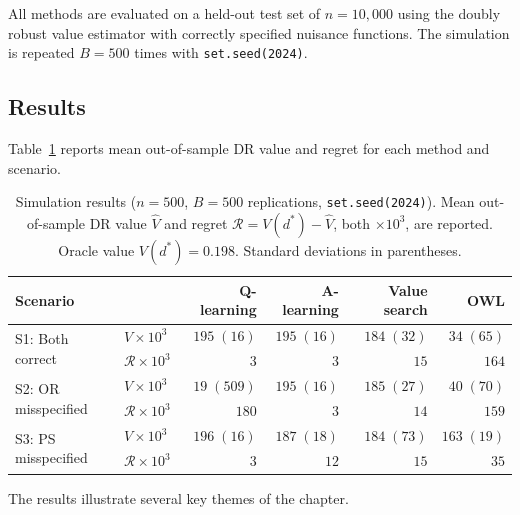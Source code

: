 \documentclass[master.tex]{subfiles}
\begin{document}
\medskip
All methods are evaluated on a held-out test set of $n=10{,}000$ using the
doubly robust value estimator with correctly specified nuisance functions.
The simulation is repeated $B=500$ times with \texttt{set.seed(2024)}.

\subsection{Results}
\label{w14:subsec:lab-results}

Table~\ref{w14:tab:sim} reports mean out-of-sample DR value and regret
for each method and scenario.

\begin{table}[ht]
\centering
\caption{Simulation results ($n=500$, $B=500$ replications,
\texttt{set.seed(2024)}). Mean out-of-sample DR value $\hat V$ and
regret $\mathcal{R}=V(d^\ast)-\hat V$, both $\times10^3$, are reported.
Oracle value $V(d^\ast)=0.198$. Standard deviations in parentheses.}
\label{w14:tab:sim}
\renewcommand{\arraystretch}{1.3}
\begin{tabular}{llrrrr}
\hline
Scenario & & Q-learning & A-learning & Value search & OWL \\
\hline
\multirow{2}{*}{S1: Both correct}
  & $\hat V\times 10^3$          & $195\;(16)$   & $195\;(16)$  & $184\;(32)$   & $\phantom{0}34\;(65)$  \\
  & $\mathcal{R}\times 10^3$     & $\phantom{0}3$& $\phantom{0}3$ & $15$        & $164$ \\[4pt]
\multirow{2}{*}{S2: OR misspecified}
  & $\hat V\times 10^3$          & $\phantom{0}19\;(509)$ & $195\;(16)$ & $185\;(27)$ & $\phantom{0}40\;(70)$ \\
  & $\mathcal{R}\times 10^3$     & $180$                  & $\phantom{0}3$ & $14$    & $159$ \\[4pt]
\multirow{2}{*}{S3: PS misspecified}
  & $\hat V\times 10^3$          & $196\;(16)$  & $187\;(18)$  & $184\;(73)$   & $163\;(19)$ \\
  & $\mathcal{R}\times 10^3$     & $\phantom{0}3$ & $12$       & $15$          & $\phantom{0}35$ \\
\hline
\end{tabular}
\end{table}

\noindent The results illustrate several key themes of the chapter.
\end{document}
